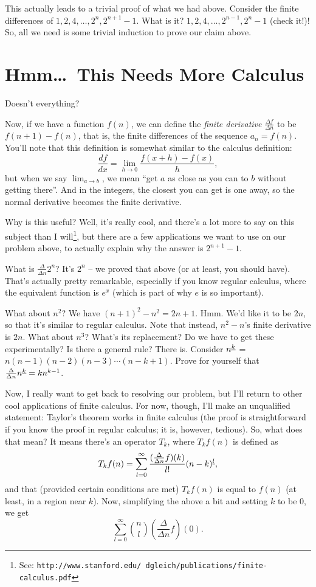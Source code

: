 \documentclass[12pt,letterpaper]{article}
\begin{document}
This actually leads to a trivial proof of what we had above. Consider
the finite differences of $1, 2, 4, \ldots, 2^n, 2^{n+1}-1$. What is
it? $1, 2, 4, \ldots, 2^{n-1}, 2^n-1$ (check it!)! So, all we need is
some trivial induction to prove our claim above.

\section{Hmm\dots\ This Needs More Calculus}
Doesn't everything?

Now, if we have a function $f(n)$, we can define the \emph{finite
derivative} $\frac{\Delta f}{\Delta n}$ to be $f(n+1)-f(n)$, that is,
the finite differences of the sequence $a_n = f(n)$. You'll note that
this definition is somewhat similar to the calculus definition:
$$\frac{df}{dx} = \lim_{h\to0}\frac{f(x+h) - f(x)}{h},$$ but when
we say $\lim_{a\to b}$, we mean ``get $a$ as close as you can to $b$
without getting there''. And in the integers, the closest you can get
is one away, so the normal derivative becomes the finite
derivative.

Why is this useful? Well, it's really cool, and there's a lot more to
say on this subject than I will\footnote{See:
\texttt{http://www.stanford.edu/\string~dgleich/publications/finite-calculus.pdf}},
but there are a few applications we want to use on our problem above,
to actually explain why the answer is $2^{n+1}-1$.

What is $\frac{\Delta}{\Delta n} 2^n$? It's $2^n$ -- we proved that above
(or at least, you should have). That's actually pretty remarkable,
especially if you know regular calculus, where the equivalent function
is $e^x$ (which is part of why $e$ is so important).

What about $n^2$? We have $(n+1)^2 - n^2 = 2n + 1$. Hmm. We'd like it to be
$2n$, so that it's similar to regular calculus. Note that instead,
$n^2 - n$'s finite derivative is $2n$. What
about $n^3$? What's its replacement? Do we have to get these
experimentally? Is there a general rule? There is. Consider
$n^{\uline k}$ = $n (n-1) (n-2) (n-3) \cdots (n-k+1)$. Prove for
yourself that $\frac{\Delta}{\Delta n} n^{\uline k} = k n^{k-1}$.

Now, I really want to get back to resolving our problem, but I'll
return to other cool applications of finite calculus. For now,
though, I'll make an unqualified statement: Taylor's theorem works in
finite calculus (the proof is straightforward if you know the proof
in regular calculus; it is, however, tedious). So, what does that
mean? It means there's an operator $T_k$, where $T_k f(n)$ is defined as
$$T_k f(n) = \sum_{l=0}^{\infty} \frac{(\frac{\Delta}{\Delta n} f)(k)}{l!}
(n-k)^{\uline l},$$ and that (provided certain conditions are met) $T_k f(n)$
is equal to $f(n)$ (at least, in a region near $k$). Now, simplifying
the above a bit and setting $k$ to be 0, we get $$\sum_{l=0}^\infty
\binom{n}{l} \left(\frac{\Delta}{\Delta n} f\right)(0).$$
\end{document}
